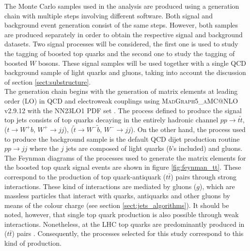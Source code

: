 \documentclass[main]{subfiles} %
\begin{document}


\doublespacing


\label{sect:event-generation-chain}
\vspace{20pt}

The Monte Carlo samples used in the analysis are produced using a generation chain with multiple steps involving different software. Both signal and background event generation consist of the same steps. However, both samples are produced separately in order to obtain the respective signal and background datasets. Two signal processes will be considered, the first one is used to study the tagging of boosted top quarks and the second one to study the tagging of boosted $W$ bosons. These signal samples will be used together with a single QCD background sample of light quarks and gluons, taking into account the discussion of section \ref{sect:substructure}.\\

The generation chain begins with the generation of matrix elements at leading order (LO) in QCD and electroweak couplings using \textsc{MadGraph5\_aMC@NLO} v2.9.12 \cite{Alwall2014} with the \textsc{NN23LO1} PDF set \cite{Ball2017}. The process defined to produce the signal top jets consists of top quarks decaying in the entirely hadronic channel $pp \rightarrow t \tilde{t}$, ($t \rightarrow W^+ b$, $W^+ \rightarrow jj$), ($\tilde{t} \rightarrow W^- \tilde{b}$, $W^- \rightarrow jj$). On the other hand, the process used to produce the background sample is the default QCD dijet production routine $pp \rightarrow jj$ where the $j$ jets are composed of light quarks ($b$'s included) and gluons.\\

The Feynman diagrams of the processes used to generate the matrix elements for the boosted top quark signal events are shown in figure \ref{fig:feynman_tt}. These correspond to the production of top quark-antiquark ($t\bar{t}$) pairs through strong interactions. These kind of interactions are mediated by gluons ($g$), which are massless particles that interact with quarks, antiquarks and other gluons by means of the colour charge (see section \ref{sect:jets_algorithms}). It should be noted, however, that single top quark production is also possible through weak interactions. Nonetheless, at the LHC top quarks are predominantly produced in ($t\bar{t}$) pairs \cite{deJong2009}. Consequently, the processes selected for this study correspond to this kind of production. \\
\end{document}
